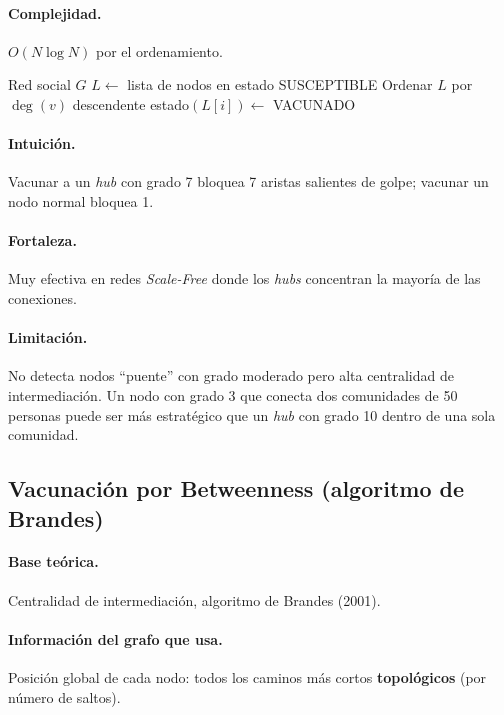 \documentclass[spanish,notitlepage,letterpaper, 12pt]{article}
\begin{document}
\paragraph{Complejidad.} $O(N \log N)$ por el ordenamiento.

\begin{algorithm}[H]
\caption{Vacunaci\'on por Hubs}
\begin{algorithmic}[1]
\Require Red social $G$
\State $L \gets$ lista de nodos en estado SUSCEPTIBLE
\State Ordenar $L$ por $\deg(v)$ descendente
    \State estado$(L[i]) \gets$ VACUNADO
\EndFor
\end{algorithmic}
\end{algorithm}

\paragraph{Intuici\'on.} Vacunar a un \textit{hub} con grado 7 bloquea 7 aristas salientes de golpe; vacunar un nodo normal bloquea 1.

\paragraph{Fortaleza.} Muy efectiva en redes \textit{Scale-Free} donde los \textit{hubs} concentran la mayor\'ia de las conexiones.

\paragraph{Limitaci\'on.} No detecta nodos ``puente'' con grado moderado pero alta centralidad de intermediaci\'on. Un nodo con grado 3 que conecta dos comunidades de 50 personas puede ser m\'as estrat\'egico que un \textit{hub} con grado 10 dentro de una sola comunidad.

\subsection{Vacunaci\'on por Betweenness (algoritmo de Brandes)}

\paragraph{Base te\'orica.} Centralidad de intermediaci\'on, algoritmo de Brandes (2001).

\paragraph{Informaci\'on del grafo que usa.} Posici\'on global de cada nodo: todos los caminos m\'as cortos \textbf{topol\'ogicos} (por n\'umero de saltos).
\end{document}
